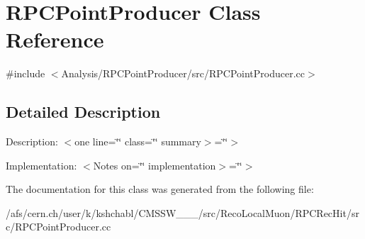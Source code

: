 \hypertarget{classRPCPointProducer}{\section{R\-P\-C\-Point\-Producer Class Reference}
\label{classRPCPointProducer}
}


{\ttfamily \#include $<$Analysis/\-R\-P\-C\-Point\-Producer/src/\-R\-P\-C\-Point\-Producer.\-cc$>$}



\subsection{Detailed Description}
Description\-: $<$one line=\char`\"{}\char`\"{} class=\char`\"{}\char`\"{} summary$>$=\char`\"{}\char`\"{}$>$

Implementation\-: $<$\-Notes on=\char`\"{}\char`\"{} implementation$>$=\char`\"{}\char`\"{}$>$ 

The documentation for this class was generated from the following file\-:\begin{DoxyCompactItemize}
\item 
/afs/cern.\-ch/user/k/kshchabl/\-C\-M\-S\-S\-W\-\_\-\_\-\_/src/\-Reco\-Local\-Muon/\-R\-P\-C\-Rec\-Hit/src/R\-P\-C\-Point\-Producer.\-cc\end{DoxyCompactItemize}

